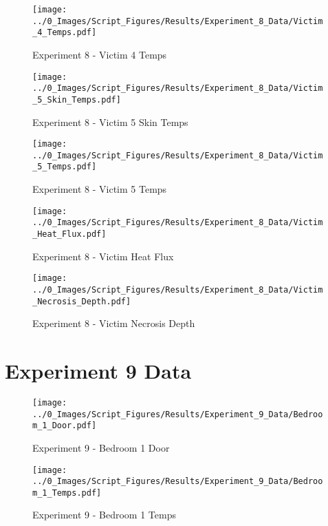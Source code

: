 	\begin{figure}[H]
		\centering
		\texttt{[image: ../0\_Images/Script\_Figures/Results/Experiment\_8\_Data/Victim\_4\_Temps.pdf]}
		\caption[]{Experiment 8 - Victim 4 Temps}
	\end{figure}
 
	\clearpage

	\begin{figure}[H]
		\centering
		\texttt{[image: ../0\_Images/Script\_Figures/Results/Experiment\_8\_Data/Victim\_5\_Skin\_Temps.pdf]}
		\caption[]{Experiment 8 - Victim 5 Skin Temps}
	\end{figure}
 

	\begin{figure}[H]
		\centering
		\texttt{[image: ../0\_Images/Script\_Figures/Results/Experiment\_8\_Data/Victim\_5\_Temps.pdf]}
		\caption[]{Experiment 8 - Victim 5 Temps}
	\end{figure}
 
	\clearpage

	\begin{figure}[H]
		\centering
		\texttt{[image: ../0\_Images/Script\_Figures/Results/Experiment\_8\_Data/Victim\_Heat\_Flux.pdf]}
		\caption[]{Experiment 8 - Victim Heat Flux}
	\end{figure}
 

	\begin{figure}[H]
		\centering
		\texttt{[image: ../0\_Images/Script\_Figures/Results/Experiment\_8\_Data/Victim\_Necrosis\_Depth.pdf]}
		\caption[]{Experiment 8 - Victim Necrosis Depth}
	\end{figure}
 
	\clearpage

\clearpage		\large
\section{Experiment 9 Data} \label{App:Exp9Results} 

	\begin{figure}[H]
		\centering
		\texttt{[image: ../0\_Images/Script\_Figures/Results/Experiment\_9\_Data/Bedroom\_1\_Door.pdf]}
		\caption[]{Experiment 9 - Bedroom 1 Door}
	\end{figure}
 

	\begin{figure}[H]
		\centering
		\texttt{[image: ../0\_Images/Script\_Figures/Results/Experiment\_9\_Data/Bedroom\_1\_Temps.pdf]}
		\caption[]{Experiment 9 - Bedroom 1 Temps}
	\end{figure}
 
